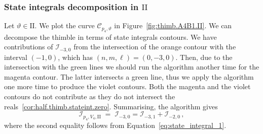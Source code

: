\documentclass[12pt,reqno]{amsart}
\theoremstyle{definition}
\def\calI{\mathcal I}
\def\calC{\mathcal C}
\def\be{\begin{equation}}
\def\ee{\end{equation}}
\renewcommand{\=}{\;=\;}
\begin{document}
\subsubsection{State integrals decomposition in $\mathrm{II}$}\label{sec:region_II}
Let $\vartheta\in\mathrm{II}$. We plot the curve $\calC_{p_4,\vartheta}$ in Figure~\ref{fig:thimb.A4B1.II}.
We can decompose the thimble in terms of state integrals contours. We have contributions of $\calI_{-3,0}$ from the intersection of the orange contour with the interval $(-1,0)$, which has $(n,m,\ell)=(0,-3,0)$. Then, due to the intersection with the green lines we should run the algorithm another time for the magenta contour. The latter intersects a green line, thus we apply the algorithm one more time to produce the violet contours. Both the magenta and the violet contours do not contribute as they do not intersect the reals~\ref{cor:half.thimb.stateint.zero}. Summarising, the algorithm gives
\be\label{eq:region_II_A4B1}
\calI_{p_4,V_4,\mathrm{II}}
\=
\calI_{-3,0}=\calI_{-3,1}+\calI_{-2,0}\,,
\ee
where the second equality follows from Equation~\eqref{eq:state_integral_1}.
\end{document}
